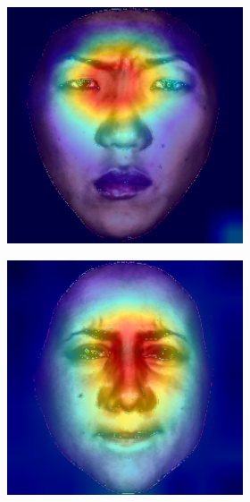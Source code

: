 \begin{figure}[ht]
    \centering
    \begin{subfigure}{0.45\textwidth}
        \centering
        \begin{subfigure}{0.45\textwidth}
            \includegraphics[width=\linewidth]{Images/Heatmaps/heatmap_anger_1.png}
        \end{subfigure}
        \begin{subfigure}{0.45\textwidth}
            \includegraphics[width=\linewidth]{Images/Heatmaps/heatmap_anger_2.png}

\end{subfigure}
\end{subfigure}
\end{figure}
